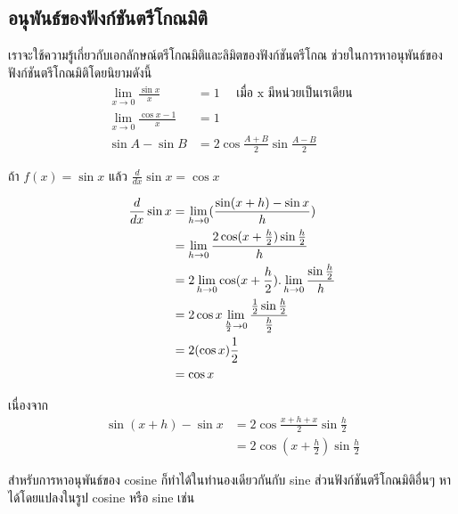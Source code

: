 \documentclass[
]{book}
\begin{document}
\subsection{อนุพันธ์ของฟังก์ชันตรีโกณมิติ}\label{uxe2duxe19uxe1euxe19uxe18uxe02uxe2duxe07uxe1fuxe07uxe01uxe0auxe19uxe15uxe23uxe42uxe01uxe13uxe21uxe15}

เราจะใช้ความรู้เกี่ยวกับเอกลักษณ์ตรีโกณมิติและลิมิตของฟังก์ชันตรีโกณ
ช่วยในการหาอนุพันธ์ของฟังก์ชันตรีโกณมิติโดยนิยามดังนี้\\
\begin{equation}   \begin{aligned}
 \lim_{x\rightarrow 0} \frac{\sin x}{x}    &= 1  \quad \text{ เมื่อ x มีหน่วยเป็นเรเดียน }\\
 \lim_{x\rightarrow 0} \frac{\cos x -1}{x} &= 1  \\
    \sin A- \sin B                         &=2 \cos \frac{A+B}{2}\sin \frac{A-B}{2}
  \end{aligned} \end{equation}

ถ้า \(f(x)=\sin x\) แล้ว \(\displaystyle \frac{d}{dx}\sin x =\cos x\)

\begin{equation}   \begin{aligned}
\displaystyle \frac{d}{dx}\sin x&=\lim_{h\rightarrow 0}(\frac{\sin
(x+h)-\sin x}{h})\\
\displaystyle  &=\lim_{h\rightarrow0} \frac{2\cos
(x+\frac{h}{2})\sin \frac{h}{2}}{h}\\
\displaystyle &=2\lim_{h\rightarrow 0}\cos
(x+\frac{h}{2}).\lim_{h\rightarrow 0} \frac{\sin \frac{h}{2}}{h}\\
\displaystyle &=2\cos x\lim_{\frac{h}{2} \rightarrow 0}\frac{\frac{1}{2}\sin
\frac{h}{2}}{\frac{h}{2}}\\
\displaystyle &=2(\cos x)\frac{1}{2}\\
&=\cos x
  \end{aligned} \end{equation}

เนื่องจาก \begin{equation}   \begin{aligned}
 \sin (x+h)- \sin x &=2\cos \frac{x+h+x}{2}\sin \frac{h}{2}\\
                        &=2\cos (x+\frac{h}{2})\sin \frac{h}{2}
  \end{aligned} \end{equation}

\hfill\break
สำหรับการหาอนุพันธ์ของ cosine ก็ทำได้ในทำนองเดียวกันกับ sine ส่วนฟังก์ชันตรีโกณมิติอื่นๆ
หาได้โดยแปลงในรูป cosine หรือ sine เช่น
\end{document}
